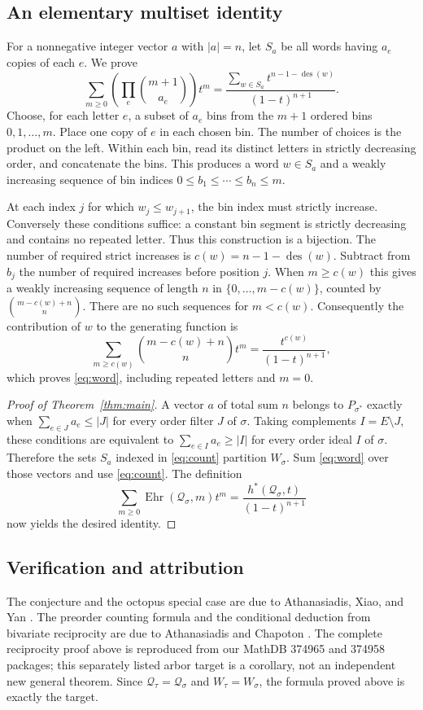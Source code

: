 \documentclass[11pt]{article}
\newcommand{\Q}{\mathcal Q}
\newcommand{\des}{\operatorname{des}}
\begin{document}
\subsection*{An elementary multiset identity}
For a nonnegative integer vector $a$ with $|a|=n$, let $S_a$
be all words having $a_e$ copies of each $e$. We prove
\begin{equation}\label{eq:word}
 \sum_{m\ge0}\left(\prod_e\binom{m+1}{a_e}\right)t^m
 =\frac{\displaystyle\sum_{w\in S_a}t^{n-1-\des(w)}}{(1-t)^{n+1}}.
\end{equation}
Choose, for each letter $e$, a subset of $a_e$ bins from the
$m+1$ ordered bins $0,1,\ldots,m$. Place one copy of $e$ in each
chosen bin. The number of choices is the product on the left.
Within each bin, read its distinct letters in strictly decreasing
order, and concatenate the bins. This produces a word $w\in S_a$
and a weakly increasing sequence of bin indices
$0\le b_1\le\cdots\le b_n\le m$.

At each index $j$ for which $w_j\le w_{j+1}$, the bin index must
strictly increase. Conversely these conditions suffice: a constant
bin segment is strictly decreasing and contains no repeated letter.
Thus this construction is a bijection. The number of required
strict increases is $c(w)=n-1-\des(w)$. Subtract from $b_j$ the
number of required increases before position $j$. When $m\ge c(w)$
this gives a weakly increasing sequence of length $n$ in
$\{0,\ldots,m-c(w)\}$, counted by
$\binom{m-c(w)+n}{n}$. There are no such sequences for $m<c(w)$.
Consequently the contribution of $w$ to the generating function is
\[
 \sum_{m\ge c(w)}\binom{m-c(w)+n}{n}t^m
 =\frac{t^{c(w)}}{(1-t)^{n+1}},
\]
which proves \eqref{eq:word}, including repeated letters and $m=0$.

\begin{proof}[Proof of Theorem~\ref{thm:main}]
A vector $a$ of total sum $n$ belongs to $P_{\sigma^*}$ exactly
when $\sum_{e\in J}a_e\le |J|$ for every order filter $J$ of
$\sigma$. Taking complements $I=E\setminus J$, these conditions
are equivalent to $\sum_{e\in I}a_e\ge |I|$ for every order
ideal $I$ of $\sigma$. Therefore the sets $S_a$ indexed in
\eqref{eq:count} partition $W_\sigma$.
Sum \eqref{eq:word} over those vectors and use \eqref{eq:count}.
The definition
\[
 \sum_{m\ge0}\operatorname{Ehr}(\Q_\sigma,m)t^m
 =\frac{h^*(\Q_\sigma,t)}{(1-t)^{n+1}}
\]
now yields the desired identity.
\end{proof}

\subsection*{Verification and attribution}
The conjecture and the octopus special case are due to
Athanasiadis, Xiao, and Yan \cite{AXY}. The preorder counting formula
and the conditional deduction from bivariate reciprocity are due to
Athanasiadis and Chapoton \cite{AC}. The complete reciprocity proof
above is reproduced from our MathDB 374965 and 374958 packages;
this separately listed arbor target is a corollary, not an independent
new general theorem. Since $\Q_\tau=\Q_\sigma$ and
$W_\tau=W_\sigma$, the formula proved above is exactly the target.
\end{document}

